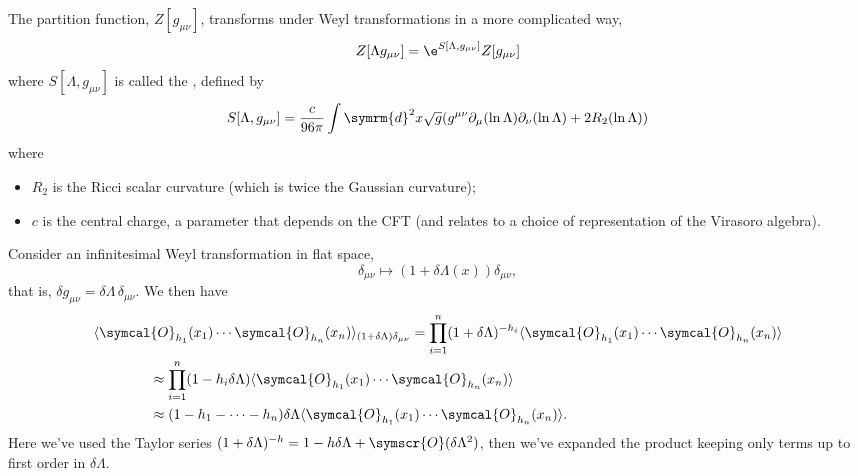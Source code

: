 \documentclass[fleqn]{NotesClass}
\renewcommand{\dl}[1]{\symrm{d}#1}
\newcommand{\quantumField}[1]{\symcal{#1}}
\DeclarePairedDelimiter{\correlator}{\langle}{\rangle}
\newcommand{\order}{\symscr{O}}
\begin{document}
    The partition function, \(Z[g_{\mu\nu}]\), transforms under Weyl transformations in a more complicated way,
    \begin{equation}
        Z[\Lambda g_{\mu\nu}] = \e^{S[\Lambda, g_{\mu\nu}]} Z[g_{\mu\nu}]
    \end{equation}
    where \(S[\Lambda, g_{\mu\nu}]\) is called the , defined by
    \begin{equation}
        S[\Lambda, g_{\mu\nu}] = \frac{c}{96\pi} \int \dl{^2x} \sqrt{g} (g^{\mu\nu} \partial_\mu (\ln \Lambda) \partial_\nu (\ln \Lambda) + 2R_2(\ln \Lambda))
    \end{equation}
    where
    \begin{itemize}
        \item \(R_2\) is the Ricci scalar curvature (which is twice the Gaussian curvature);
        \item \(c\) is the central charge, a parameter that depends on the CFT (and relates to a choice of representation of the Virasoro algebra).
    \end{itemize}
    
    Consider an infinitesimal Weyl transformation in flat space,
    \begin{equation}
        \delta_{\mu\nu} \mapsto (1 + \delta \Lambda(x)) \delta_{\mu\nu},
    \end{equation}
    that is, \(\delta g_{\mu\nu} = \delta \Lambda \, \delta_{\mu\nu}\).
    We then have
    \begin{align}
        &\correlator{\quantumField{O}_{h_1}(x_1) \dotsm \quantumField{O}_{h_n}(x_n)}_{(1 + \delta \Lambda) \delta_{\mu\nu}} = \prod_{i=1}^{n} (1 + \delta \Lambda)^{-h_i} \correlator{\quantumField{O}_{h_1}(x_1) \dotsm \quantumField{O}_{h_n}(x_n)} \notag\\
        &\qquad\qquad\approx \prod_{i=1}^n (1 - h_i \delta \Lambda) \correlator{\quantumField{O}_{h_1}(x_1) \dotsm \quantumField{O}_{h_n}(x_n)}\\
        &\qquad\qquad\approx (1 - h_1 - \dotsb - h_n) \delta\Lambda \correlator{\quantumField{O}_{h_1}(x_1) \dotsm \quantumField{O}_{h_n}(x_n)}.
    \end{align}
    Here we've used the Taylor series \((1 + \delta \Lambda)^{-h} = 1 - h \delta \Lambda + \order(\delta \Lambda^2)\), then we've expanded the product keeping only terms up to first order in \(\delta \Lambda\).
    
\end{document}
